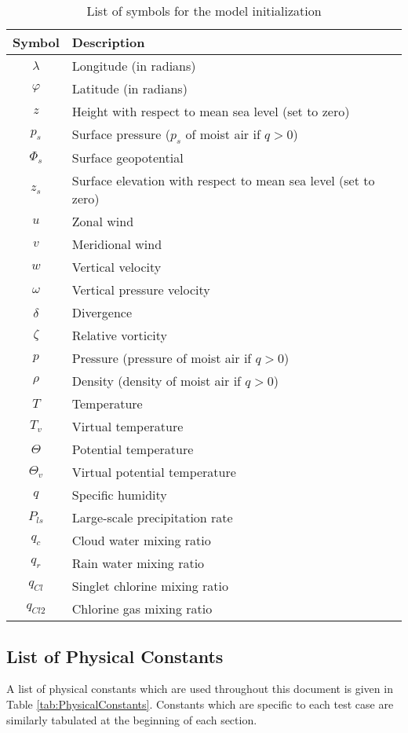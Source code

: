 \documentclass[times,doublespace]{fldauth}
\begin{document}
\begin{table}[h]
\caption{List of symbols for the model initialization} \label{tab:symbols}
\begin{center}
\begin{tabular}{cl}
\hline Symbol & Description \\ \hline 
$\lambda$ & Longitude (in radians) \\
$\varphi$ & Latitude (in radians) \\
$z$ & Height with respect to mean sea level (set to zero) \\
$p_s$ & Surface pressure ($p_s$ of moist air if $q>0$) \\
$\Phi_s$ & Surface geopotential \\
$z_s$ & Surface elevation with respect to mean sea level (set to zero) \\
$u$ & Zonal wind \\
$v$ & Meridional wind \\
$w$ & Vertical velocity \\
$\omega$ & Vertical pressure velocity  \\
$\delta$ & Divergence\\
$\zeta$ & Relative vorticity\\
$p$ & Pressure (pressure of moist air if $q>0$) \\
$\rho$ & Density (density of moist air if $q>0$)\\
$T$ &Temperature \\
$T_v$ & Virtual temperature \\
$\Theta$ & Potential temperature \\
$\Theta_v$ & Virtual potential temperature \\
$q$ & Specific humidity \\
$P_{ls}$ & Large-scale precipitation rate \\
$q_c$ & Cloud water mixing ratio \\
$q_r$ & Rain water mixing ratio \\
$q_{Cl}$ & Singlet chlorine mixing ratio \\
$q_{Cl2}$ & Chlorine gas mixing ratio \\
\hline 
\end{tabular}
\end{center}
\end{table}

\subsection{List of Physical Constants}
A list of physical constants which are used throughout this document is given in Table \ref{tab:PhysicalConstants}.  Constants which are specific to each test case are similarly tabulated at the beginning of each section.
\end{document}
